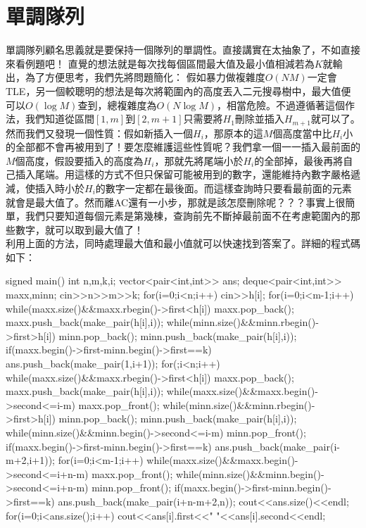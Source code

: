\section{單調隊列}
單調隊列顧名思義就是要保持一個隊列的單調性。直接講實在太抽象了，不如直接來看例題吧！
直覺的想法就是每次找每個區間最大值及最小值相減若為$K$就輸出，為了方便思考，我們先將問題簡化：
假如暴力做複雜度$O(NM)$一定會TLE，另一個較聰明的想法是每次將範圍內的高度丟入二元搜尋樹中，最大值便可以$O(\log M)$查到，總複雜度為$O(N\log M)$，相當危險。不過遵循著這個作法，我們知道從區間$[1,m]$到$[2,m+1]$只需要將$H_1$刪除並插入$H_{m+1}$就可以了。\\
	然而我們又發現一個性質：假如新插入一個$H_i$，那原本的這$M$個高度當中比$H_i$小的全部都不會再被用到了！要怎麼維護這些性質呢？我們拿一個一一插入最前面的$M$個高度，假設要插入的高度為$H_i$，那就先將尾端小於$H_i$的全部掉，最後再將自己插入尾端。用這樣的方式不但只保留可能被用到的數字，還能維持內數字嚴格遞減，使插入時小於$H_i$的數字一定都在最後面。而這樣查詢時只要看最前面的元素就會是最大值了。然而離AC還有一小步，那就是該怎麼刪除呢？？？事實上很簡單，我們只要知道每個元素是第幾棟，查詢前先不斷掉最前面不在考慮範圍內的那些數字，就可以取到最大值了！\\
利用上面的方法，同時處理最大值和最小值就可以快速找到答案了。詳細的程式碼如下：
\begin{C++}
signed main() {
  int n,m,k,i;
  vector<pair<int,int>> ans;
  deque<pair<int,int>> maxx,minn;
  cin>>n>>m>>k;
  for(i=0;i<n;i++)
    cin>>h[i];
  for(i=0;i<m-1;i++){
    while(maxx.size()&&maxx.rbegin()->first<h[i])
      maxx.pop_back();
    maxx.push_back(make_pair(h[i],i));
    while(minn.size()&&minn.rbegin()->first>h[i])
      minn.pop_back();
    minn.push_back(make_pair(h[i],i));
    if(maxx.begin()->first-minn.begin()->first==k)
      ans.push_back(make_pair(1,i+1));
  }
  for(;i<n;i++){
    while(maxx.size()&&maxx.rbegin()->first<h[i])
      maxx.pop_back();
    maxx.push_back(make_pair(h[i],i));
    while(maxx.size()&&maxx.begin()->second<=i-m)
      maxx.pop_front();
    while(minn.size()&&minn.rbegin()->first>h[i])
      minn.pop_back();
    minn.push_back(make_pair(h[i],i));
    while(minn.size()&&minn.begin()->second<=i-m)
      minn.pop_front();
    if(maxx.begin()->first-minn.begin()->first==k)
      ans.push_back(make_pair(i-m+2,i+1));
  }
  for(i=0;i<m-1;i++){
    while(maxx.size()&&maxx.begin()->second<=i+n-m)
      maxx.pop_front();
    while(minn.size()&&minn.begin()->second<=i+n-m)
      minn.pop_front();
    if(maxx.begin()->first-minn.begin()->first==k)
      ans.push_back(make_pair(i+n-m+2,n));
  }
  cout<<ans.size()<<endl;
  for(i=0;i<ans.size();i++)
    cout<<ans[i].first<<" "<<ans[i].second<<endl;
}
\end{C++}